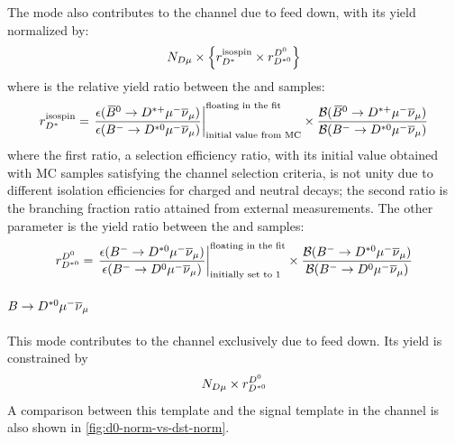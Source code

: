 The \Dstarp\muon mode also contributes to the \Dz channel due to feed down,
with its yield normalized by:
\begin{equation}
    N_{D\mu} \times \left\{
        r_{{{D}^*}}^\text{isospin} \times r_{{{D}^{*0}}}^\text{{\ensuremath{{D}^0}}}
    \right\}
\end{equation}
where \fitDstISO is the relative yield ratio between the \Dstarp\muon and
\Dstarz\muon samples:
\begin{equation}
    r_{{{D}^*}}^\text{isospin} =
    \left.\frac{
        \epsilon({{\kern 0.18em\overline{\kern -0.18em B}}{}^0} \rightarrow {\ensuremath{{D}^{*+}}}{\ensuremath{\mu^-}}{\ensuremath{{\overline{\nu}}_\mu}})
    }{
        \epsilon({{{B}^-}} \rightarrow {\ensuremath{{D}^{*0}}}{\ensuremath{\mu^-}}{\ensuremath{{\overline{\nu}}_\mu}})
    }\right|_\text{initial value from MC}^\text{floating in the fit}\times
    \frac{
        \mathcal{B}({{\kern 0.18em\overline{\kern -0.18em B}}{}^0} \rightarrow {\ensuremath{{D}^{*+}}}{\ensuremath{\mu^-}}{\ensuremath{{\overline{\nu}}_\mu}})
    }{
        \mathcal{B}({{{B}^-}} \rightarrow {\ensuremath{{D}^{*0}}}{\ensuremath{\mu^-}}{\ensuremath{{\overline{\nu}}_\mu}})
    }
\end{equation}
where the first ratio, a selection efficiency ratio,
with its initial value obtained with MC samples satisfying the \Dz channel
selection criteria,
is not unity due to different isolation efficiencies for charged
\Dstarp and neutral \Dstarz decays;
the second ratio is the branching fraction ratio attained from external
measurements.
The other parameter \fitnormfd is the yield ratio between the \Dstarz\muon and
\Dz\muon samples:
\begin{equation}
    r_{{{D}^{*0}}}^\text{{\ensuremath{{D}^0}}} =
    \left.\frac{
        \epsilon({{{B}^-}} \rightarrow {\ensuremath{{D}^{*0}}}{\ensuremath{\mu^-}}{\ensuremath{{\overline{\nu}}_\mu}})
    }{
        \epsilon({{{B}^-}} \rightarrow {\ensuremath{{D}^0}}{\ensuremath{\mu^-}}{\ensuremath{{\overline{\nu}}_\mu}})
    }\right|_\text{initially set to 1}^\text{floating in the fit} \times
    \frac{
        \mathcal{B}({{{B}^-}} \rightarrow {\ensuremath{{D}^{*0}}}{\ensuremath{\mu^-}}{\ensuremath{{\overline{\nu}}_\mu}})
    }{
        \mathcal{B}({{{B}^-}} \rightarrow {\ensuremath{{D}^0}}{\ensuremath{\mu^-}}{\ensuremath{{\overline{\nu}}_\mu}})
    }
\end{equation}

\paragraph{$B \rightarrow D^{*0}{\mu^-}{{\overline{\nu}}_\mu}$}
This mode contributes to the \Dz channel exclusively due to feed down.
Its yield is constrained by
\begin{equation}
    N_{D\mu} \times r_{{{D}^{*0}}}^\text{{\ensuremath{{D}^0}}}
\end{equation}
A comparison between this template and the signal template in the \Dz
channel is also shown in \cref{fig:d0-norm-vs-dst-norm}.

